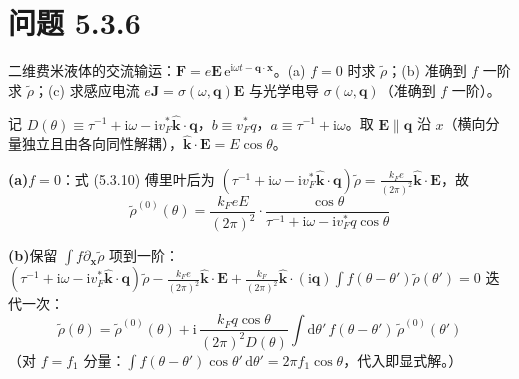 \section*{问题 5.3.6}
\begin{problem}
二维费米液体的交流输运：$\pmb{F}=e\pmb{E}\,\mathrm{e}^{\mathrm{i}\omega t-\pmb{q}\cdot\pmb{x}}$。(a) $f=0$ 时求 $\tilde\rho$；(b) 准确到 $f$ 一阶求 $\tilde\rho$；(c) 求感应电流 $e\pmb{J}=\sigma(\omega,\pmb{q})\pmb{E}$ 与光学电导 $\sigma(\omega,\pmb{q})$（准确到 $f$ 一阶）。
\end{problem}
\solution

记 $D(\theta)\equiv\tau^{-1}+\mathrm{i}\omega-\mathrm{i}v_F^{*}\hat{\pmb{k}}\cdot\pmb{q}$，$b\equiv v_F^{*}q$，$a\equiv\tau^{-1}+\mathrm{i}\omega$。取 $\pmb{E}\parallel\pmb{q}$ 沿 $x$（横向分量独立且由各向同性解耦），$\hat{\pmb{k}}\cdot\pmb{E}=E\cos\theta$。

\textbf{(a)}$f=0$：式 (5.3.10) 傅里叶后为 $(\tau^{-1}+\mathrm{i}\omega-\mathrm{i}v_F^{*}\hat{\pmb{k}}\cdot\pmb{q})\tilde\rho=\frac{k_Fe}{(2\pi)^{2}}\hat{\pmb{k}}\cdot\pmb{E}$，故
\begin{equation*}
\boxed{\;\tilde\rho^{(0)}(\theta)=\frac{k_FeE}{(2\pi)^{2}}\cdot\frac{\cos\theta}{\tau^{-1}+\mathrm{i}\omega-\mathrm{i}v_F^{*}q\cos\theta}\;}
\end{equation*}

\textbf{(b)}保留 $\int f\partial_{\pmb{x}}\tilde\rho$ 项到一阶：$(\tau^{-1}+\mathrm{i}\omega-\mathrm{i}v_F^{*}\hat{\pmb{k}}\cdot\pmb{q})\tilde\rho-\frac{k_Fe}{(2\pi)^{2}}\hat{\pmb{k}}\cdot\pmb{E}+\frac{k_F}{(2\pi)^{2}}\hat{\pmb{k}}\cdot(\mathrm{i}\pmb{q})\int f(\theta-\theta')\tilde\rho(\theta')=0$ 迭代一次：
\begin{equation*}
\boxed{\;\tilde\rho(\theta)=\tilde\rho^{(0)}(\theta)
+\mathrm{i}\,\frac{k_Fq\cos\theta}{(2\pi)^{2}D(\theta)}
\int\mathrm{d}\theta'\,f(\theta-\theta')\,\tilde\rho^{(0)}(\theta')\;}
\end{equation*}
（对 $f=f_1$ 分量：$\int f(\theta-\theta')\cos\theta'\,\mathrm{d}\theta'=2\pi f_1\cos\theta$，代入即显式解。）

